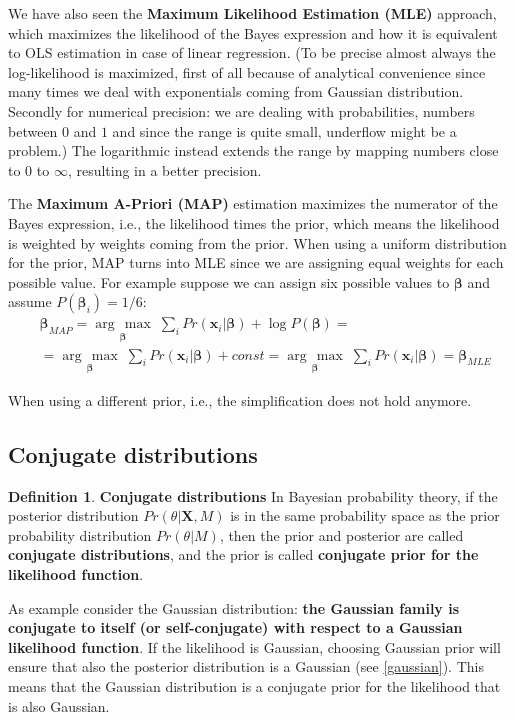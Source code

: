 \documentclass[12pt, letterpaper]{article}
\theoremstyle{definition}
\newtheorem{definition}{Definition}[section]
\newcommand{\X}{\mathrm{\mathbf{X}}}
\newcommand{\be}{\mathbf{\beta}}
\newcommand{\x}{\mathbf{x}}
\newcommand{\argmax}[1]{\underset{#1}{\operatorname{arg}\,\operatorname{max}}\;}
\begin{document}
We have also seen the \textbf{Maximum Likelihood Estimation (MLE)} approach, which maximizes the likelihood of the Bayes expression and how it is equivalent to OLS estimation in case of linear regression. (To be precise almost always the log-likelihood is maximized, first of all because of analytical convenience since many times we deal with exponentials coming from Gaussian distribution. Secondly for numerical precision: we are dealing with probabilities, numbers between $0$ and $1$ and since the range is quite small, underflow might be a problem.) The logarithmic instead extends the range by mapping numbers close to $0$ to $\infty$, resulting in a better precision.

The \textbf{Maximum A-Priori (MAP)} estimation maximizes the numerator of the Bayes expression, i.e., the likelihood times the prior, which means the likelihood is weighted by weights coming from the prior. When using a uniform distribution for the prior, MAP turns into MLE since we are assigning equal weights for each possible value. For example suppose we can assign six possible values to $\be$ and assume $P(\be_i)=1/6$:
\begin{equation}
\begin{aligned}
&\be_{MAP} = \argmax{\be}{\sum_i Pr(\x_i|\be) + \log P(\be)} =
\\&= \argmax{\be}{\sum_i Pr(\x_i|\be) +const}=\argmax{\be}{\sum_i Pr(\x_i|\be)} = \be_{MLE}
\end{aligned}
\end{equation}

When using a different prior, i.e., the simplification does not hold anymore.

\subsection{Conjugate distributions}
\label{conjugacy}
\begin{definition}{\textbf{Conjugate distributions}}
In Bayesian probability theory, if the posterior distribution $Pr(\theta|\X,M)$ is in the same probability space as the prior probability distribution $Pr(\theta|M)$, then the prior and posterior are called \textbf{conjugate distributions}, and the prior is called \textbf{conjugate prior for the likelihood function}. 
\end{definition}

As example consider the Gaussian distribution: \textbf{the Gaussian family is conjugate to itself (or self-conjugate) with respect to a Gaussian likelihood function}. If the likelihood is Gaussian, choosing Gaussian prior will ensure that also the posterior distribution is a Gaussian (see \ref{gaussian}). This means that the Gaussian distribution is a conjugate prior for the likelihood that is also Gaussian.
\end{document}
